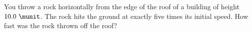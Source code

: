 You throw a rock horizontally from the edge of the roof of a building
of height $10.0\ \munit$. The rock hits the ground at
exactly five times its initial speed. How fast was the rock thrown off the
roof?\answercheck
